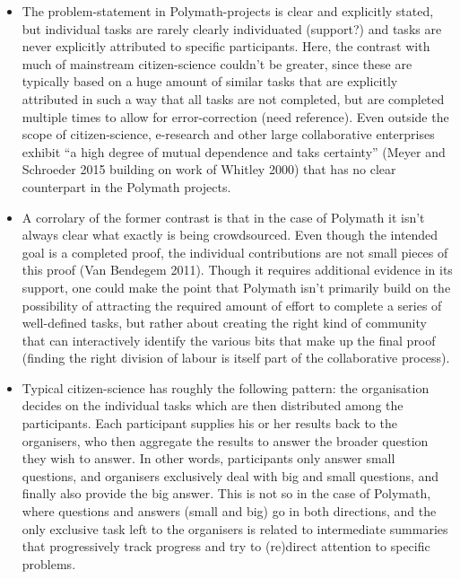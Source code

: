 \documentclass[article, floatfix, groupaddress, prb]{revtex4-1}
\providecommand{\tightlist}{%
      \setlength{\itemsep}{0pt}\setlength{\parskip}{0pt}}
\begin{document}
\begin{itemize}
\tightlist
\item
  The problem-statement in Polymath-projects is clear and explicitly
  stated, but individual tasks are rarely clearly individuated
  (support?) and tasks are never explicitly attributed to specific
  participants. Here, the contrast with much of mainstream
  citizen-science couldn't be greater, since these are typically based
  on a huge amount of similar tasks that are explicitly attributed in
  such a way that all tasks are not completed, but are completed
  multiple times to allow for error-correction (need reference). Even
  outside the scope of citizen-science, e-research and other large
  collaborative enterprises exhibit ``a high degree of mutual dependence
  and taks certainty'' (Meyer and Schroeder 2015 building on work of
  Whitley 2000) that has no clear counterpart in the Polymath projects.
\item
  A corrolary of the former contrast is that in the case of Polymath it
  isn't always clear what exactly is being crowdsourced. Even though the
  intended goal is a completed proof, the individual contributions are
  not small pieces of this proof (Van Bendegem 2011). Though it requires
  additional evidence in its support, one could make the point that
  Polymath isn't primarily build on the possibility of attracting the
  required amount of effort to complete a series of well-defined tasks,
  but rather about creating the right kind of community that can
  interactively identify the various bits that make up the final proof
  (finding the right division of labour is itself part of the
  collaborative process).
\item
  Typical citizen-science has roughly the following pattern: the
  organisation decides on the individual tasks which are then
  distributed among the participants. Each participant supplies his or
  her results back to the organisers, who then aggregate the results to
  answer the broader question they wish to answer. In other words,
  participants only answer small questions, and organisers exclusively
  deal with big and small questions, and finally also provide the big
  answer. This is not so in the case of Polymath, where questions and
  answers (small and big) go in both directions, and the only exclusive
  task left to the organisers is related to intermediate summaries that
  progressively track progress and try to (re)direct attention to
  specific problems.
\end{itemize}
\end{document}
